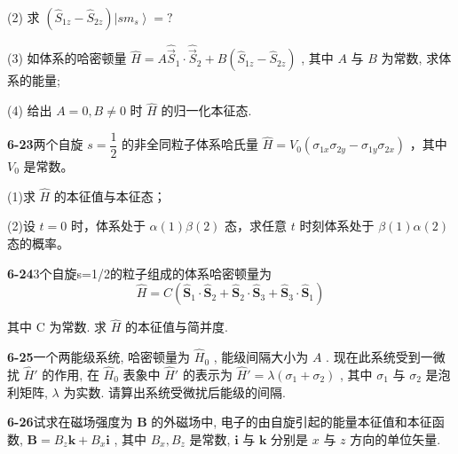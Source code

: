 (2) 求 $\displaystyle (\hat{S}_{1z} - \hat{S}_{2z})\left|sm_s\right\rangle = ?$

(3) 如体系的哈密顿量 $\displaystyle \hat{H} = A\hat{\vec{S}}_1\cdot \hat{\vec{S}}_2 + B(\hat{S}_{1z} - \hat{S}_{2z})$ , 其中 $\displaystyle A$ 与 $\displaystyle B$ 为常数, 求体系的能量;

(4) 给出 $\displaystyle A = 0, B \neq 0$ 时 $\displaystyle \hat{H}$ 的归一化本征态.

\vfill

\newpage

\textbf{6-23}\quad 两个自旋 $\displaystyle s = \dfrac{1}{2}$ 的非全同粒子体系哈氏量 $\displaystyle \hat{H} = V_0(\sigma_{1x}\sigma_{2y} - \sigma_{1y}\sigma_{2x})$ ，其中 $\displaystyle V_0$ 是常数。

(1)求 $\displaystyle \hat{H}$ 的本征值与本征态；

(2)设 $\displaystyle t = 0$ 时，体系处于 $\displaystyle \alpha(1)\beta(2)$ 态，求任意 $\displaystyle t$ 时刻体系处于 $\displaystyle \beta(1)\alpha(2)$ 态的概率。

\vfill

\newpage

\textbf{6-24}\quad 3个自旋s=1/2的粒子组成的体系哈密顿量为
$$
\hat {H} = C \left(\hat {\boldsymbol {S}} _ {1} \cdot \hat {\boldsymbol {S}} _ {2} + \hat {\boldsymbol {S}} _ {2} \cdot \hat {\boldsymbol {S}} _ {3} + \hat {\boldsymbol {S}} _ {3} \cdot \hat {\boldsymbol {S}} _ {1}\right)
$$

其中 C 为常数. 求 $\displaystyle \hat{H}$ 的本征值与简并度.

\vfill

\newpage

\textbf{6-25}\quad 一个两能级系统, 哈密顿量为 $\displaystyle \hat{H}_0$ , 能级间隔大小为 $\displaystyle A$ . 现在此系统受到一微扰 $\displaystyle \hat{H}'$ 的作用, 在 $\displaystyle \hat{H}_0$ 表象中 $\displaystyle \hat{H}'$ 的表示为 $\displaystyle \hat{H}' = \lambda (\sigma_1 + \sigma_2)$ , 其中 $\displaystyle \sigma_1$ 与 $\displaystyle \sigma_2$ 是泡利矩阵, $\displaystyle \lambda$ 为实数. 请算出系统受微扰后能级的间隔.

\vfill

\newpage

\textbf{6-26}\quad 试求在磁场强度为 $\displaystyle \pmb{B}$ 的外磁场中, 电子的由自旋引起的能量本征值和本征函数, $\displaystyle \pmb{B} = B_{z}\pmb{k} + B_{x}\pmb{i}$ , 其中 $\displaystyle B_{x}, B_{z}$ 是常数, $\displaystyle \pmb{i}$ 与 $\displaystyle \pmb{k}$ 分别是 $\displaystyle x$ 与 $\displaystyle z$ 方向的单位矢量.

